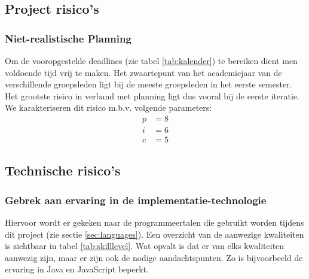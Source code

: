 \subsection{Project risico's}
\subsubsection{Niet-realistische Planning}
Om de vooropgestelde deadlines (zie tabel \ref{tab:kalender}) te bereiken dient men voldoende tijd vrij te maken. Het zwaartepunt van het academiejaar van de verschillende groepsleden ligt bij de meeste groepsleden in het eerste semester. Het grootste risico in verband met planning ligt dus vooral bij de eerste iteratie. We karakteriseren dit risico m.b.v. volgende parameters:
\begin{align*}
	p &= 8\\
	i &= 6\\
	c &= 5
\end{align*}

\subsection{Technische risico's}
\subsubsection{Gebrek aan ervaring in de implementatie-technologie}
Hiervoor wordt er gekeken naar de programmeertalen die gebruikt worden tijdens dit project (zie sectie \ref{sec:languages}). Een overzicht van de aanwezige kwaliteiten is zichtbaar in tabel \ref{tab:skilllevel}. Wat opvalt is dat er van elks kwaliteiten aanwezig zijn, maar er zijn ook de nodige aandachtspunten. Zo is bijvoorbeeld de ervaring in Java en JavaScript beperkt.

